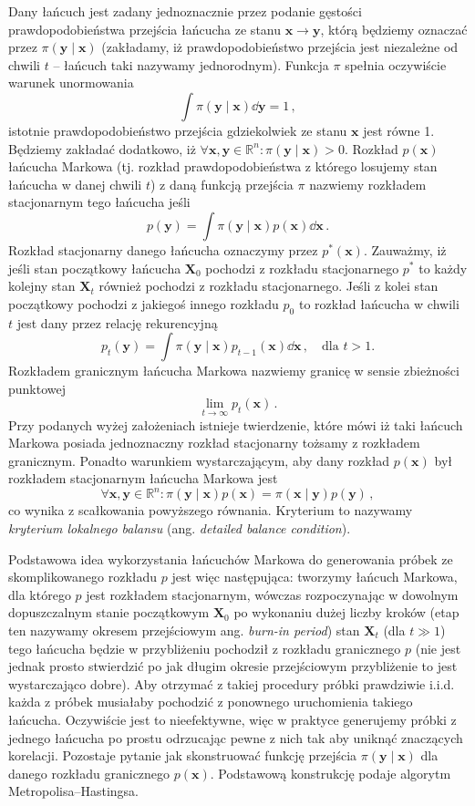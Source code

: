\documentclass{myclass}
\begin{document}
Dany łańcuch jest zadany jednoznacznie przez podanie gęstości prawdopodobieństwa przejścia łańcucha
ze stanu \(\bm{x} \to \bm{y}\), którą będziemy oznaczać przez \(\pi(\bm{y} \mid \bm{x})\)
(zakładamy, iż prawdopodobieństwo przejścia jest niezależne od chwili \(t\) -- łańcuch taki nazywamy
jednorodnym). Funkcja \(\pi\) spełnia oczywiście warunek unormowania
\[
\int \pi(\bm{y} \mid \bm{x}) \dd{\bm{y}} = 1\,,
\]
istotnie prawdopodobieństwo przejścia gdziekolwiek ze stanu \(\bm{x}\) jest równe 1. Będziemy
zakładać dodatkowo, iż \(\forall \bm{x},\bm{y}\in\mathbb{R}^n: \pi(\bm{y} \mid \bm{x}) > 0\).
Rozkład \(p(\bm{x})\) łańcucha Markowa (tj. rozkład prawdopodobieństwa z którego losujemy stan
łańcucha w danej chwili \(t\)) z daną funkcją przejścia \(\pi\) nazwiemy rozkładem stacjonarnym tego
łańcucha jeśli
\[
p(\bm{y}) = \int \pi(\bm{y} \mid \bm{x})p(\bm{x}) \dd{\bm{x}}\,.
\]
Rozkład stacjonarny danego łańcucha oznaczymy przez \(p^*(\bm{x})\). Zauważmy, iż jeśli stan
początkowy łańcucha \(\bm{X}_0\) pochodzi z rozkładu stacjonarnego \(p^*\) to każdy kolejny stan
\(\bm{X}_t\) również pochodzi z rozkładu stacjonarnego. Jeśli z kolei stan początkowy pochodzi z
jakiegoś innego rozkładu \(p_0\) to rozkład łańcucha w chwili \(t\) jest dany przez relację
rekurencyjną
\[
p_t(\bm{y}) = \int \pi(\bm{y} \mid \bm{x})p_{t-1}(\bm{x}) \dd{\bm{x}}\,,\quad\text{dla \(t > 1\).}
\]
Rozkładem granicznym łańcucha Markowa nazwiemy granicę w sensie zbieżności punktowej
\[
\lim_{t\to\infty} p_t(\bm{x})\,.
\]
Przy podanych wyżej założeniach istnieje twierdzenie, które mówi iż taki łańcuch Markowa posiada
jednoznaczny rozkład stacjonarny tożsamy z rozkładem granicznym. Ponadto warunkiem wystarczającym,
aby dany rozkład \(p(\bm{x})\) był rozkładem stacjonarnym łańcucha Markowa jest
\[
\forall\bm{x}, \bm{y} \in \mathbb{R}^n: \pi(\bm{y}\mid\bm{x}) p(\bm{x}) = \pi(\bm{x} \mid \bm{y}) p(\bm{y})\,,
\]
co wynika z scałkowania powyższego równania. Kryterium to nazywamy \emph{kryterium lokalnego
balansu} (ang. \emph{detailed balance condition}).

Podstawowa idea wykorzystania łańcuchów Markowa do generowania próbek ze skomplikowanego rozkładu
\(p\) jest więc następująca: tworzymy łańcuch Markowa, dla którego \(p\) jest rozkładem
stacjonarnym, wówczas rozpoczynając w dowolnym dopuszczalnym stanie początkowym \(\bm{X}_0\) po
wykonaniu dużej liczby kroków (etap ten nazywamy okresem przejściowym ang. \emph{burn-in period})
stan \(\bm{X}_t\) (dla \(t \gg 1\)) tego łańcucha będzie w przybliżeniu pochodził z rozkładu
granicznego \(p\) (nie jest jednak prosto stwierdzić po jak długim okresie przejściowym przybliżenie
to jest wystarczająco dobre). Aby otrzymać z takiej procedury próbki prawdziwie i.i.d. każda z
próbek musiałaby pochodzić z ponownego uruchomienia takiego łańcucha. Oczywiście jest to
nieefektywne, więc w praktyce generujemy próbki z jednego łańcucha po prostu odrzucając pewne z nich
tak aby uniknąć znaczących korelacji. Pozostaje pytanie jak skonstruować funkcję przejścia
\(\pi(\bm{y} \mid \bm{x})\) dla danego rozkładu granicznego \(p(\bm{x})\). Podstawową konstrukcję
podaje algorytm Metropolisa--Hastingsa. 
\end{document}
